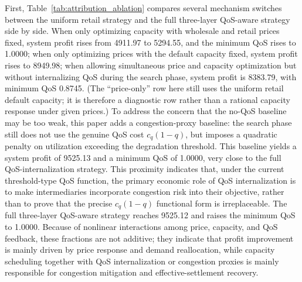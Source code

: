\documentclass[11pt,a4paper]{article}
\begin{document}
First, Table~\ref{tab:attribution_ablation} compares several mechanism switches between the uniform retail strategy and the full three-layer QoS-aware strategy side by side. When only optimizing capacity with wholesale and retail prices fixed, system profit rises from 4911.97 to 5294.55, and the minimum QoS rises to 1.0000; when only optimizing prices with the default capacity fixed, system profit rises to 8949.98; when allowing simultaneous price and capacity optimization but without internalizing QoS during the search phase, system profit is 8383.79, with minimum QoS 0.8745. (The ``price-only'' row here still uses the uniform retail default capacity; it is therefore a diagnostic row rather than a rational capacity response under given prices.) To address the concern that the no-QoS baseline may be too weak, this paper adds a congestion-proxy baseline: the search phase still does not use the genuine QoS cost $c_q(1-q)$, but imposes a quadratic penalty on utilization exceeding the degradation threshold. This baseline yields a system profit of 9525.13 and a minimum QoS of 1.0000, very close to the full QoS-internalization strategy. This proximity indicates that, under the current threshold-type QoS function, the primary economic role of QoS internalization is to make intermediaries incorporate congestion risk into their objective, rather than to prove that the precise $c_q(1-q)$ functional form is irreplaceable. The full three-layer QoS-aware strategy reaches 9525.12 and raises the minimum QoS to 1.0000. Because of nonlinear interactions among price, capacity, and QoS feedback, these fractions are not additive; they indicate that profit improvement is mainly driven by price response and demand reallocation, while capacity scheduling together with QoS internalization or congestion proxies is mainly responsible for congestion mitigation and effective-settlement recovery.

\begin{table}[H]
\centering
\caption{Diagnostic ablation of system-profit improvement. The diagnostic gain shares are not additive causal decompositions.}
\label{tab:attribution_ablation}
\small
{}
\end{table}
\end{document}
